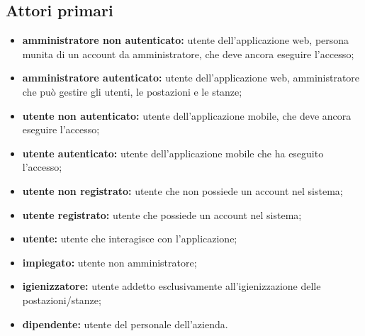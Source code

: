\subsection{Attori primari}
\begin{itemize}
    \item \textbf{amministratore non autenticato:} utente dell'applicazione web, persona munita di un account da amministratore, che deve ancora eseguire l'accesso;
    \item \textbf{amministratore autenticato:} utente dell'applicazione web, amministratore che pu\`{o} gestire gli utenti, le postazioni e le stanze;
    \item \textbf{utente non autenticato:} utente dell'applicazione mobile, che deve ancora eseguire l'accesso;
    \item \textbf{utente autenticato:} utente dell'applicazione mobile che ha eseguito l'accesso;
    \item \textbf{utente non registrato:} utente che non possiede un account nel sistema;
    \item \textbf{utente registrato:} utente che possiede un account nel sistema;
    \item \textbf{utente:} utente che interagisce con l'applicazione;
    \item \textbf{impiegato:} utente non amministratore;
    \item \textbf{igienizzatore:} utente addetto esclusivamente all'igienizzazione delle postazioni/stanze;
    \item \textbf{dipendente:} utente del personale dell'azienda.
\end{itemize}
